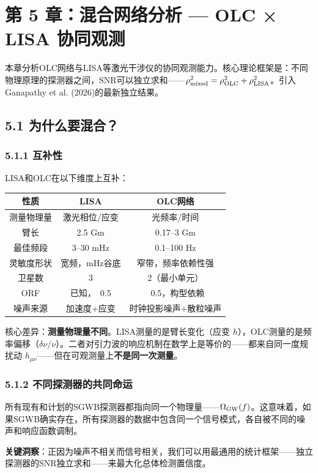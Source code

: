 \documentclass[12pt,a4paper]{article}
\begin{document}
\section{第 5 章：混合网络分析 — OLC × LISA 协同观测}


本章分析OLC网络与LISA等激光干涉仪的协同观测能力。核心理论框架是：不同物理原理的探测器之间，SNR可以独立求和——$\rho_{\rm mixed}^2 = \rho_{\rm OLC}^2 + \rho_{\rm LISA}^2$。引入Ganapathy et al. (2026)的最新独立结果。

\subsection{5.1 为什么要混合？}


\subsubsection{5.1.1 互补性}


LISA和OLC在以下维度上互补：

\begin{tabular}{|c|c|c|}
\hline
性质 & LISA & OLC网络 \\
\hline
测量物理量 & 激光相位/应变 & 光频率/时间 \\
臂长 & 2.5 Gm & 0.17–3 Gm \\
最佳频段 & 3–30 mHz & 0.1–100 Hz \\
灵敏度形状 & 宽频，mHz谷底 & 窄带，频率依赖性强 \\
卫星数 & 3 & 2（最小单元） \\
ORF & 已知，~0.5 & ~0.5，构型依赖 \\
噪声来源 & 加速度+应变 & 时钟投影噪声+散粒噪声 \\
\hline
\end{tabular}


核心差异：\textbf{测量物理量不同}。LISA测量的是臂长变化（应变 $h$），OLC测量的是频率偏移（$\delta\nu/\nu$）。二者对引力波的响应机制在数学上是等价的——都来自同一度规扰动 $h_{\mu\nu}$——但在可观测量上\textbf{不是同一次测量}。

\subsubsection{5.1.2 不同探测器的共同命运}


所有现有和计划的SGWB探测器都指向同一个物理量——$\Omega_{\rm GW}(f)$。这意味着，如果SGWB确实存在，所有探测器的数据中包含同一个信号模式，各自被不同的噪声和响应函数调制。

\textbf{关键洞察}：正因为噪声不相关而信号相关，我们可以用最通用的统计框架——独立探测器的SNR独立求和——来最大化总体检测置信度。
\end{document}
